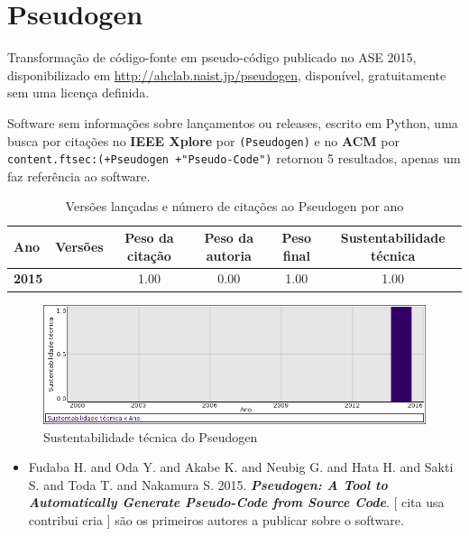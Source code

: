 \section{Pseudogen}

Transformação de código-fonte em pseudo-código
publicado no ASE 2015,
disponibilizado em \url{http://ahclab.naist.jp/pseudogen},
disponível,
gratuitamente
sem uma licença definida.

Software sem informações sobre lançamentos ou releases,
escrito em Python,
uma busca por citações no {\bf IEEE Xplore} por
\texttt{(Pseudogen)}
e no {\bf ACM} por
\texttt{content.ftsec:(+Pseudogen +"Pseudo-Code")}
retornou
5 resultados,
apenas um faz referência ao software.


\begin{table}[H]
\caption{Versões lançadas e número de citações ao Pseudogen por ano}
\centering
\begin{tabular}{| l | c | c | c | c | c |}
  \hline
  Ano & Versões & Peso da citação & Peso da autoria & Peso final & Sustentabilidade técnica \\
  \hline
            {\bf 2015}
          &
          
          &
          1.00
          &
          0.00
          &
          1.00
          &
            {\color{blue} 1.00}
          \\
\hline
\end{tabular}
\end{table}

\begin{figure}[h]
  \center
  \includegraphics[scale=0.50]{result-documents/charts/pseudogen.png}
  \caption{Sustentabilidade técnica do Pseudogen}
\end{figure}


\begin{itemize}
\item Fudaba H. and Oda Y. and Akabe K. and Neubig G. and Hata H. and Sakti S. and Toda T. and Nakamura S.
      2015.
        \textbf{\textit{ Pseudogen: A Tool to Automatically Generate Pseudo-Code from Source Code}}.
      [
          cita
          usa
          contribui
          cria
      ]
são os primeiros autores a publicar sobre o software.
\end{itemize}
